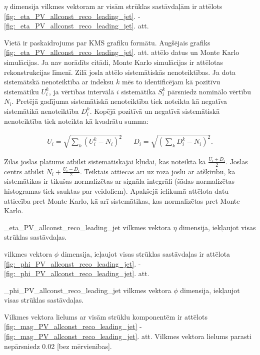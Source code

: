 $\eta$ dimensija vilkmes vektoram ar visām strūklas sastāvdaļām ir attēlots \ref{fig:_eta_PV_allconst_reco_leading_jet}. - \ref{fig:_eta_PV_allconst_reco_leading_jet}. att.

Vietā ir paskaidrojums par KMS grafiku formātu. Augšējais grafiks \ref{fig:_eta_PV_allconst_reco_leading_jet}. att. attēlo datus un Monte Karlo simulācijas. Ja nav norādīts citādi, Monte Karlo simulācijas ir attēlotas rekonstrukcijas līmenī. Zilā josla attēlo sistemātiskās nenoteiktības. Ja dota sistemātskā nenoteiktība ar indeksu $k$ mēs to identificējam kā pozitīvu sistemātiku $U^{k}_{i}$, ja vērtības intervālā $i$ sistemātika $S^{k}_i$ pārsniedz nominālo vērtību $N_{i}$. Pretējā gadījuma sistemātiskā nenoteiktība tiek noteikta kā negatīva sistemātikā nenoteiktība $D^{k}_{i}$. Kopējā pozitīvā un negatīvā sistemātiskā nenoteiktība tiek noteikta kā kvadrātu summa:

\begin{align}
U_{i}=\sqrt{\sum_{k}\left(U^{k}_{i}-N_{i}\right)^{2}} && D_{i}=\sqrt{\left(\sum_{k}D^{k}_{i}-N_{i}\right)^{2}}.
\end{align}

Zilās joslas platums atbilst sistemātiskajai kļūdai, kas noteikta kā $\frac{U_{i}+D_{i}}{2}$. Joslas centrs atbilst $N_{i} + \frac{U_{i}-D_{i}}{2}$. Teiktais attiecas arī uz rozā joslu ar atšķirību, ka sistemātikas ir tikušas normalizētas ar signāla integrāli (šādas normalizētas histogramas tiek sauktas par \gls{veidoliem}). Apakšejā ielikumā attēlota datu attiecība pret Monte Karlo, kā arī sistemātikas, kas normalizētas pret Monte Karlo.

          {_eta_PV_allconst_reco_leading_jet}
          {\leadingjet vilkmes vektora $\eta$ dimensija, iekļaujot visas strūklas sastāvdaļas.}

\leadingjet vilkmes vektora  $\phi$ dimensija, ieļaujot visas strūklas sastāvdaļas ir attēlota \ref{fig:_phi_PV_allconst_reco_leading_jet}. - \ref{fig:_phi_PV_allconst_reco_leading_jet}. att. 

          {_phi_PV_allconst_reco_leading_jet}
          {\leadingjet vilkmes vektora $\phi$ dimensija, iekļaujot visas strūklas sastāvdaļas.}

Vilkmes vektora lielums ar visām strūklu komponentēm ir attēlots \ref{fig:_mag_PV_allconst_reco_leading_jet} - \ref{fig:_mag_PV_allconst_reco_leading_jet}. att. Vilkmes vektora lielums parasti nepārsniedz 0.02 [bez mērvienības].

